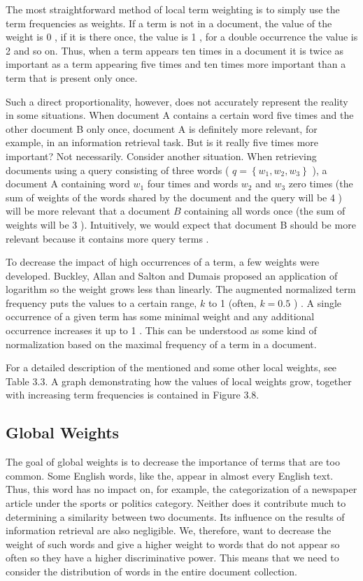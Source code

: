 \documentclass[11pt,openany,executivepaper]{book}
\begin{document}
The most straightforward method of local term weighting is to simply use the term frequencies as weights. If a term is not in a document, the value of the weight is 0 , if it is there once, the value is 1 , for a double occurrence the value is 2 and so on. Thus, when a term appears ten times in a document it is twice as important as a term appearing five times and ten times more important than a term that is present only once.

Such a direct proportionality, however, does not accurately represent the reality in some situations. When document A contains a certain word five times and the other document B only once, document A is definitely more relevant, for example, in an information retrieval task. But is it really five times more important? Not necessarily. Consider another situation. When retrieving documents using a query consisting of three words ( $q=\left\{w_{1}, w_{2}, w_{3}\right\}$ ), a document A containing word $w_{1}$ four times and words $w_{2}$ and $w_{3}$ zero times (the sum of weights of the words shared by the document and the query will be 4 ) will be more relevant that a document $B$ containing all words once (the sum of weights will be 3 ). Intuitively, we would expect that document B should be more relevant because it contains more query terms \cite{252}.

To decrease the impact of high occurrences of a term, a few weights were developed. Buckley, Allan and Salton \cite{41} and Dumais \cite{77} proposed an application of logarithm so the weight grows less than linearly. The augmented normalized term frequency puts the values to a certain range, $k$ to 1 (often, $k=0.5$ ) \cite{235}. A single occurrence of a given term has some minimal weight and any additional occurrence increases it up to 1 . This can be understood as some kind of normalization based on the maximal frequency of a term in a document.

For a detailed description of the mentioned and some other local weights, see Table 3.3. A graph demonstrating how the values of local weights grow, together with increasing term frequencies is contained in Figure 3.8.

\subsection{Global Weights}
The goal of global weights is to decrease the importance of terms that are too common. Some English words, like the, appear in almost every English text. Thus, this word has no impact on, for example, the categorization of a newspaper article under the sports or politics category. Neither does it contribute much to determining a similarity between two documents. Its influence on the results of information retrieval are also negligible. We, therefore, want to decrease the weight of such words and give a higher weight to words that do not appear so often so they have a higher discriminative power. This means that we need to consider the distribution of words in the entire document collection.
\end{document}
